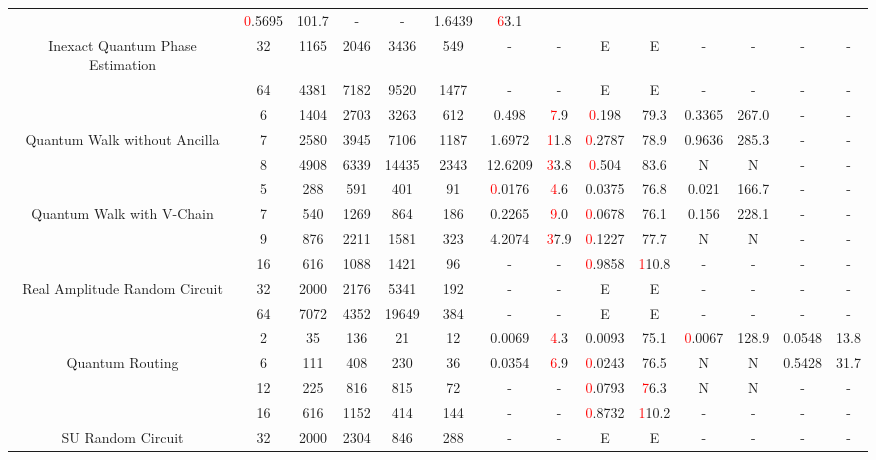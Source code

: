 \begin{table}[htb]
{\begin{tabular}{|c|c|c|c|c|c|c|c|c|c|c|c|c|c|}
 & \textcolor{red}0.5695 & 101.7
 & - & -
 & 1.6439 & \textcolor{red}63.1
 \\
Inexact Quantum Phase Estimation & 
32 & 1165 & 2046 & 3436 & 549
 & - & -
 & E & E
 & - & -
 & - & -
 \\
 & 
64 & 4381 & 7182 & 9520 & 1477
 & - & -
 & E & E
 & - & -
 & - & -
 \\
\hline
 & 
6 & 1404 & 2703 & 3263 & 612
 & 0.498 & \textcolor{red}7.9
 & \textcolor{red}0.198 & 79.3
 & 0.3365 & 267.0
 & - & -
 \\
Quantum Walk without Ancilla & 
7 & 2580 & 3945 & 7106 & 1187
 & 1.6972 & \textcolor{red}11.8
 & \textcolor{red}0.2787 & 78.9
 & 0.9636 & 285.3
 & - & -
 \\
 & 
8 & 4908 & 6339 & 14435 & 2343
 & 12.6209 & \textcolor{red}33.8
 & \textcolor{red}0.504 & 83.6
 & N & N 
 & - & -
 \\
\hline
 & 
5 & 288 & 591 & 401 & 91
 & \textcolor{red}0.0176 & \textcolor{red}4.6
 & 0.0375 & 76.8
 & 0.021 & 166.7
 & - & -
 \\
Quantum Walk with V-Chain & 
7 & 540 & 1269 & 864 & 186
 & 0.2265 & \textcolor{red}9.0
 & \textcolor{red}0.0678 & 76.1
 & 0.156 & 228.1
 & - & -
 \\
 & 
9 & 876 & 2211 & 1581 & 323
 & 4.2074 & \textcolor{red}37.9
 & \textcolor{red}0.1227 & 77.7
 & N & N 
 & - & -
 \\
\hline
 & 
16 & 616 & 1088 & 1421 & 96
 & - & -
 & \textcolor{red}0.9858 & \textcolor{red}110.8
 & - & -
 & - & -
 \\
Real Amplitude Random Circuit & 
32 & 2000 & 2176 & 5341 & 192
 & - & -
 & E & E
 & - & -
 & - & -
 \\
 & 
64 & 7072 & 4352 & 19649 & 384
 & - & -
 & E & E
 & - & -
 & - & -
 \\
\hline
 & 
2 & 35 & 136 & 21 & 12
 & 0.0069 & \textcolor{red}4.3
 & 0.0093 & 75.1
 & \textcolor{red}0.0067 & 128.9
 & 0.0548 & 13.8
 \\
Quantum Routing & 
6 & 111 & 408 & 230 & 36
 & 0.0354 & \textcolor{red}6.9
 & \textcolor{red}0.0243 & 76.5
 & N & N 
 & 0.5428 & 31.7
 \\
 & 
12 & 225 & 816 & 815 & 72
 & - & -
 & \textcolor{red}0.0793 & \textcolor{red}76.3
 & N & N 
 & - & -
 \\
\hline
 & 
16 & 616 & 1152 & 414 & 144
 & - & -
 & \textcolor{red}0.8732 & \textcolor{red}110.2
 & - & -
 & - & -
 \\
SU Random Circuit & 
32 & 2000 & 2304 & 846 & 288
 & - & -
 & E & E
 & - & -
 & - & -
 \\

\end{tabular}}
\end{table}
